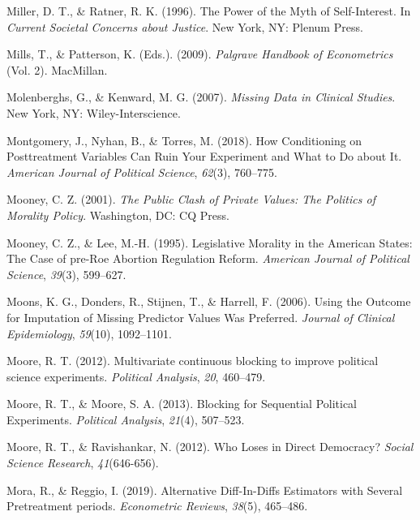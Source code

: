 \documentclass[12pt,econ]{sources/authesis}
\begin{document}
\leavevmode\hypertarget{ref-miller_power_1996}{}%
Miller, D. T., \& Ratner, R. K. (1996). The Power of the Myth of Self-Interest. In \emph{Current Societal Concerns about Justice}. New York, NY: Plenum Press.

\leavevmode\hypertarget{ref-mills_2009_palgrave}{}%
Mills, T., \& Patterson, K. (Eds.). (2009). \emph{Palgrave Handbook of Econometrics} (Vol. 2). MacMillan.

\leavevmode\hypertarget{ref-molenberghs_2007_missing}{}%
Molenberghs, G., \& Kenward, M. G. (2007). \emph{Missing Data in Clinical Studies}. New York, NY: Wiley-Interscience.

\leavevmode\hypertarget{ref-montgomery_1962_conditioning}{}%
Montgomery, J., Nyhan, B., \& Torres, M. (2018). How Conditioning on Posttreatment Variables Can Ruin Your Experiment and What to Do about It. \emph{American Journal of Political Science}, \emph{62}(3), 760--775.

\leavevmode\hypertarget{ref-mooney_public_2001}{}%
Mooney, C. Z. (2001). \emph{The Public Clash of Private Values: The Politics of Morality Policy}. Washington, DC: CQ Press.

\leavevmode\hypertarget{ref-mooney_1995_legislative}{}%
Mooney, C. Z., \& Lee, M.-H. (1995). Legislative Morality in the American States: The Case of pre-Roe Abortion Regulation Reform. \emph{American Journal of Political Science}, \emph{39}(3), 599--627.

\leavevmode\hypertarget{ref-moons_2006_using}{}%
Moons, K. G., Donders, R., Stijnen, T., \& Harrell, F. (2006). Using the Outcome for Imputation of Missing Predictor Values Was Preferred. \emph{Journal of Clinical Epidemiology}, \emph{59}(10), 1092--1101.

\leavevmode\hypertarget{ref-moore_2012_multivariate}{}%
Moore, R. T. (2012). Multivariate continuous blocking to improve political science experiments. \emph{Political Analysis}, \emph{20}, 460--479.

\leavevmode\hypertarget{ref-moore_blocking_2013}{}%
Moore, R. T., \& Moore, S. A. (2013). Blocking for Sequential Political Experiments. \emph{Political Analysis}, \emph{21}(4), 507--523.

\leavevmode\hypertarget{ref-moore_2012_loses}{}%
Moore, R. T., \& Ravishankar, N. (2012). Who Loses in Direct Democracy? \emph{Social Science Research}, \emph{41}(646-656).

\leavevmode\hypertarget{ref-mora_2019_alternative}{}%
Mora, R., \& Reggio, I. (2019). Alternative Diff-In-Diffs Estimators with Several Pretreatment periods. \emph{Econometric Reviews}, \emph{38}(5), 465--486.
\end{document}
